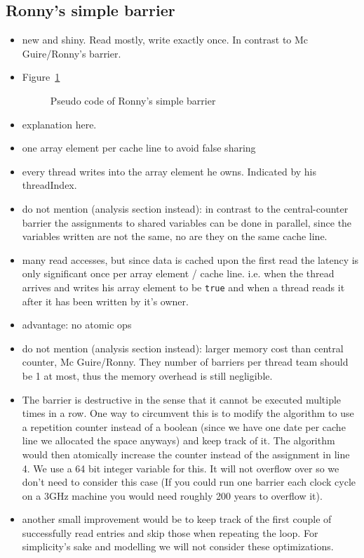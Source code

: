 \documentclass[a4paper, 10pt]{article}
\begin{document}
\subsection{Ronny's simple barrier}
\begin{itemize}
	\item new and shiny. Read mostly, write exactly once. In contrast to Mc Guire/Ronny's barrier.
	\item Figure~\ref{fig:ronny-simple-no-reset}
		\begin{figure}[htbp]
			\centering
			
			\caption{Pseudo code of Ronny's simple barrier}
			\label{fig:ronny-simple-no-reset}
		\end{figure}
	\item explanation here.
	\item one array element per cache line to avoid false sharing\cite{falsesharing}
	\item every thread writes into the array element he owns. Indicated by his threadIndex.
	\item do not mention (analysis section instead): in contrast to the central-counter barrier the assignments to shared variables can be done in parallel, since the variables written are not the same, no are they on the same cache line.
	\item many read accesses, but since data is cached upon the first read the latency is only significant once per array element / cache line. i.e. when the thread arrives and writes his array element to be \texttt{true} and when a thread reads it after it has been written by it's owner.
	\item advantage: no atomic ops
	\item do not mention (analysis section instead): larger memory cost than central counter, Mc Guire/Ronny. They number of barriers per thread team should be 1 at most, thus the memory overhead is still negligible.
	\item The barrier is destructive in the sense that it cannot be executed multiple times in a row. One way to circumvent this is to modify the algorithm to use a repetition counter instead of a boolean (since we have one date per cache line we allocated the space anyways) and keep track of it. The algorithm would then atomically increase the counter instead of the assignment in line 4. We use a 64 bit integer variable for this. It will not overflow over so we don't need to consider this case (If you could run one barrier each clock cycle on a 3GHz machine you would need roughly 200 years to overflow it).
	\item another small improvement would be to keep track of the first couple of successfully read entries and skip those when repeating the loop. For simplicity's sake and modelling we will not consider these optimizations.
\end{itemize}
\end{document}
